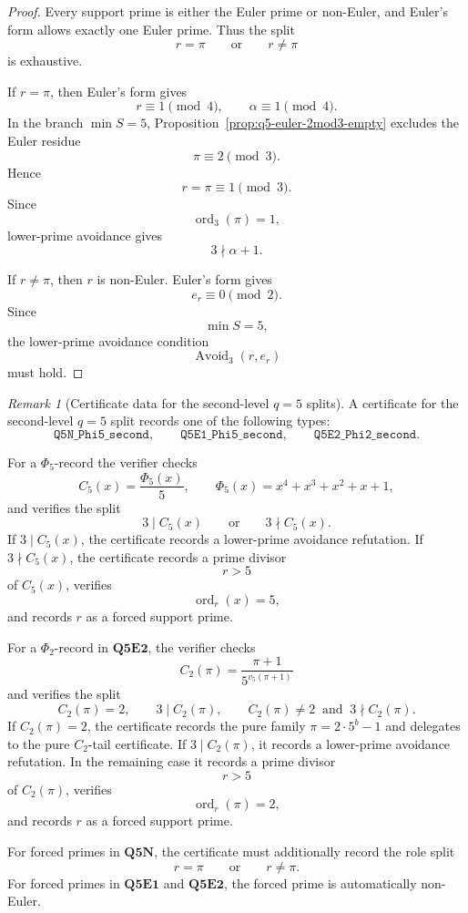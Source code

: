 \documentclass[11pt]{article}
\theoremstyle{definition}
\theoremstyle{remark}
\newtheorem{remark}[theorem]{Remark}
\DeclareMathOperator{\ord}{ord}
\begin{document}
\begin{proof}
Every support prime is either the Euler prime or non-Euler, and Euler's form
allows exactly one Euler prime.  Thus the split
\[
  r=\pi
  \qquad\text{or}\qquad
  r\ne\pi
\]
is exhaustive.

If \(r=\pi\), then Euler's form gives
\[
  r\equiv1\pmod4,
  \qquad
  \alpha\equiv1\pmod4.
\]
In the branch \(\min S=5\), Proposition~\ref{prop:q5-euler-2mod3-empty}
excludes the Euler residue
\[
  \pi\equiv2\pmod3.
\]
Hence
\[
  r=\pi\equiv1\pmod3.
\]
Since
\[
  \ord_3(\pi)=1,
\]
lower-prime avoidance gives
\[
  3\nmid\alpha+1.
\]

If \(r\ne\pi\), then \(r\) is non-Euler.  Euler's form gives
\[
  e_r\equiv0\pmod2.
\]
Since
\[
  \min S=5,
\]
the lower-prime avoidance condition
\[
  \operatorname{Avoid}_3(r,e_r)
\]
must hold.
\end{proof}

\begin{remark}[Certificate data for the second-level \(q=5\) splits]
A certificate for the second-level \(q=5\) split records one of the following
types:
\[
  \mathtt{Q5N\_Phi5\_second},
  \qquad
  \mathtt{Q5E1\_Phi5\_second},
  \qquad
  \mathtt{Q5E2\_Phi2\_second}.
\]

For a \(\Phi_5\)-record the verifier checks
\[
  C_5(x)=\frac{\Phi_5(x)}5,
  \qquad
  \Phi_5(x)=x^4+x^3+x^2+x+1,
\]
and verifies the split
\[
  3\mid C_5(x)
  \qquad\text{or}\qquad
  3\nmid C_5(x).
\]
If \(3\mid C_5(x)\), the certificate records a lower-prime avoidance
refutation.  If \(3\nmid C_5(x)\), the certificate records a prime divisor
\[
  r>5
\]
of \(C_5(x)\), verifies
\[
  \ord_r(x)=5,
\]
and records \(r\) as a forced support prime.

For a \(\Phi_2\)-record in \(\mathbf{Q5E2}\), the verifier checks
\[
  C_2(\pi)=\frac{\pi+1}{5^{v_5(\pi+1)}}
\]
and verifies the split
\[
  C_2(\pi)=2,
  \qquad
  3\mid C_2(\pi),
  \qquad
  C_2(\pi)\ne2\ \text{ and }\ 3\nmid C_2(\pi).
\]
If \(C_2(\pi)=2\), the certificate records the pure family
\(\pi=2\cdot5^b-1\) and delegates to the pure \(C_2\)-tail certificate.  If
\(3\mid C_2(\pi)\), it records a lower-prime avoidance refutation.  In the
remaining case it records a prime divisor
\[
  r>5
\]
of \(C_2(\pi)\), verifies
\[
  \ord_r(\pi)=2,
\]
and records \(r\) as a forced support prime.

For forced primes in \(\mathbf{Q5N}\), the certificate must additionally record
the role split
\[
  r=\pi
  \qquad\text{or}\qquad
  r\ne\pi.
\]
For forced primes in \(\mathbf{Q5E1}\) and \(\mathbf{Q5E2}\), the forced prime
is automatically non-Euler.
\end{remark}
\end{document}
